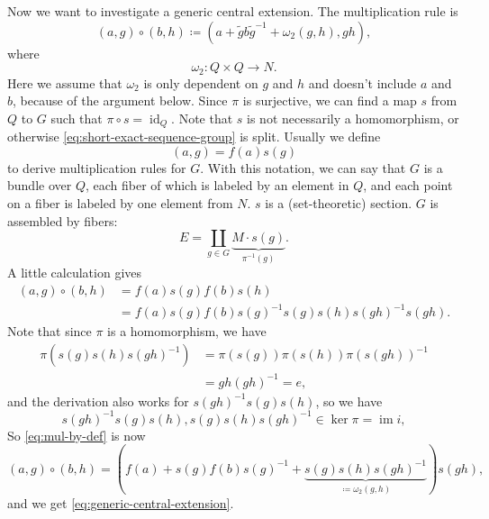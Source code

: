 \documentclass[hyperref, a4paper]{article}
\DeclareMathOperator{\id}{id}
\DeclareMathOperator{\im}{im}
\begin{document}
Now we want to investigate a generic central extension. The multiplication rule is 
\begin{equation}
    (a, g) \circ (b, h) \coloneqq (a + \tilde{g} b \tilde{g}^{-1} + \omega_2(g, h), gh),
    \label{eq:generic-central-extension}
\end{equation}
where
\begin{equation}
    \omega_2 : Q \times Q \to N.
\end{equation}
Here we assume that $\omega_2$ is only dependent on $g$ and $h$ and doesn't include $a$ and $b$, 
because of the argument below. Since $\pi$ is surjective, we can find a map $s$ from $Q$ to $G$ such that 
$\pi \circ s = \id_Q$. Note that $s$ is not necessarily a homomorphism, or otherwise 
\eqref{eq:short-exact-sequence-group} is split. %
Usually we define 
\begin{equation}
    (a, g) = f(a) s(g)
    \label{eq:pair-element-def}
\end{equation}
to derive multiplication rules for $G$. With this notation, we can say that $G$ is a bundle over $Q$, each 
fiber of which is labeled by an element in $Q$, and each point on a fiber is labeled by one element from $N$. 
$s$ is a (set-theoretic) section. $G$ is assembled by fibers:
\begin{equation}
    E = \coprod_{g \in G} \underbrace{M \cdot s (g)}_{\pi^{-1}(g)}.
\end{equation}
A little calculation gives
\begin{equation}
    \begin{aligned}
        (a, g) \circ (b, h) &= f(a) s(g) f(b) s(h) \\
        &= f(a) s(g) f(b) s(g)^{-1} s(g) s(h) s(gh)^{-1} s(gh).
    \end{aligned}
    \label{eq:mul-by-def}
\end{equation}
Note that since $\pi$ is a homomorphism, we have 
\[
    \begin{aligned}
        \pi (s(g) s(h) s(gh)^{-1}) &= \pi(s(g)) \pi(s(h)) \pi(s(gh))^{-1} \\
        &= g h (gh)^{-1} = e,
    \end{aligned}
\]
and the derivation also works for $s(gh)^{-1} s(g) s(h)$, so we have 
\begin{equation}
    s(gh)^{-1} s(g) s(h), s(g) s(h) s(gh)^{-1} \in \ker \pi = \im i,
    \label{eq:s-inv-pi-return-n}
\end{equation}
So \eqref{eq:mul-by-def} is now 
\[
    (a, g) \circ (b, h) = (f(a) + s(g) f(b) s(g)^{-1} + \underbrace{s(g) s(h) s(gh)^{-1}}_{\coloneqq \omega_2(g,h)}) s(gh),
\]
and we get \eqref{eq:generic-central-extension}.
\end{document}
